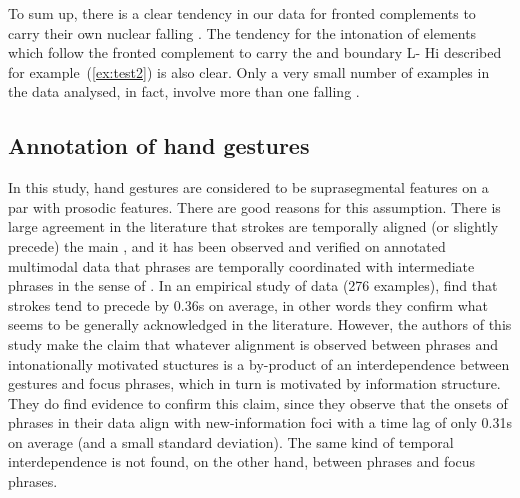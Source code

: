 \documentclass[output=paper]{LSP/langsci}
\begin{document}
To sum up, there is a clear tendency in our data for fronted complements to carry
their own nuclear falling . The
tendency for the intonation of elements which follow the fronted
complement to carry the  and boundary  L- Hi
described for example~(\ref{ex:test2}) is also clear. Only a very
small number of examples in the data analysed, in fact, involve more
than one falling .


\subsection{Annotation of hand gestures}

In this study, hand gestures are considered to be suprasegmental features
on a par with prosodic features. There are good reasons for this
assumption.
There is large agreement in the literature that  strokes
are temporally aligned (or slightly precede) the main 
\citep{Kendon80,Bolinger86,McNeill92,AlahverdzhievaLascarides10}, and
it has been observed and verified on annotated multimodal data
\citep{Loehr04, Loehr07} that  phrases are temporally
coordinated with intermediate phrases in the sense of
\citet{Pierrehumbert80}. In an empirical study of  data (276
examples), \citet{Ebertetal11} find that  strokes tend to
precede  by 0.36s on average, in other words they
confirm what seems to be generally acknowledged in the literature. However,
the authors of this study make the claim that whatever alignment is
observed between  phrases and intonationally motivated
stuctures is a by-product of an interdependence between gestures and
focus phrases, which in turn is motivated by information
structure. They do find evidence to confirm this claim, since they
observe that the onsets of  phrases in their data align with
new-information foci with a time lag of only 0.31s on average (and a
small standard deviation). The same kind of temporal
interdependence is not found, on the other hand, between 
phrases and  focus phrases.
\end{document}
